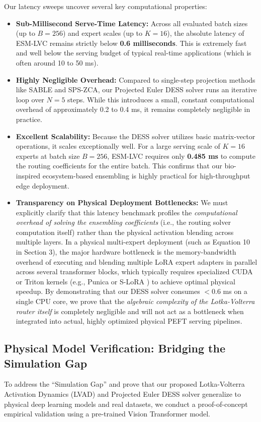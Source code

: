 Our latency sweeps uncover several key computational properties:
\begin{itemize}
    \item \textbf{Sub-Millisecond Serve-Time Latency:} Across all evaluated batch sizes (up to $B=256$) and expert scales (up to $K=16$), the absolute latency of ESM-LVC remains strictly below \textbf{0.6 milliseconds}. This is extremely fast and well below the serving budget of typical real-time applications (which is often around 10 to 50 ms).
    \item \textbf{Highly Negligible Overhead:} Compared to single-step projection methods like SABLE and SPS-ZCA, our Projected Euler DESS solver runs an iterative loop over $N=5$ steps. While this introduces a small, constant computational overhead of approximately 0.2 to 0.4 ms, it remains completely negligible in practice. 
    \item \textbf{Excellent Scalability:} Because the DESS solver utilizes basic matrix-vector operations, it scales exceptionally well. For a large serving scale of $K=16$ experts at batch size $B=256$, ESM-LVC requires only \textbf{0.485 ms} to compute the routing coefficients for the entire batch. This confirms that our bio-inspired ecosystem-based ensembling is highly practical for high-throughput edge deployment.
    \item \textbf{Transparency on Physical Deployment Bottlenecks:} We must explicitly clarify that this latency benchmark profiles the \emph{computational overhead of solving the ensembling coefficients} (i.e., the routing solver computation itself) rather than the physical activation blending across multiple layers. In a physical multi-expert deployment (such as Equation 10 in Section 3), the major hardware bottleneck is the memory-bandwidth overhead of executing and blending multiple LoRA expert adapters in parallel across several transformer blocks, which typically requires specialized CUDA or Triton kernels (e.g., Punica \cite{chen2023punica} or S-LoRA \cite{sheng2023slora}) to achieve optimal physical speedup. By demonstrating that our DESS solver consumes $<0.6$ ms on a single CPU core, we prove that the \emph{algebraic complexity of the Lotka-Volterra router itself} is completely negligible and will not act as a bottleneck when integrated into actual, highly optimized physical PEFT serving pipelines.
\end{itemize}

\subsection{Physical Model Verification: Bridging the Simulation Gap}
\label{subsec:physical_verification}
To address the ``Simulation Gap'' and prove that our proposed Lotka-Volterra Activation Dynamics (LVAD) and Projected Euler DESS solver generalize to physical deep learning models and real datasets, we conduct a proof-of-concept empirical validation using a pre-trained Vision Transformer model.

